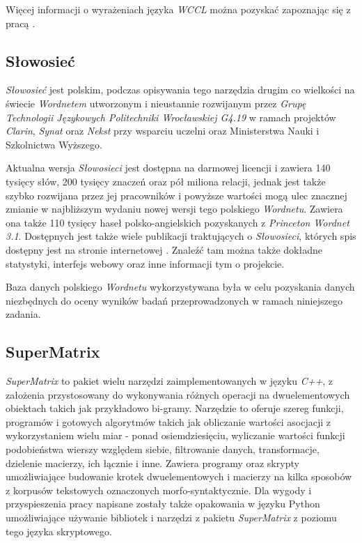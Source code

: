 \documentclass[11pt,a4paper]{llncs}
\begin{document}
Więcej informacji o wyrażeniach języka \emph{WCCL} można pozyskać zapoznając się z pracą \cite{wccl}.


\subsection{Słowosieć}

\emph{Słowosieć} jest polskim, podczas opisywania tego narzędzia drugim co wielkości na świecie \emph{Wordnetem} utworzonym i nieustannie rozwijanym przez \emph{Grupę Technologii Językowych Politechniki Wrocławskiej G4.19} w ramach projektów \emph{Clarin}, \emph{Synat} oraz \emph{Nekst} przy wsparciu uczelni oraz Ministerstwa Nauki i Szkolnictwa Wyższego.



Aktualna wersja \emph{Słowosieci} jest dostępna na darmowej licencji i zawiera 140 tysięcy słów, 200 tysięcy znaczeń oraz pół miliona relacji, jednak jest także szybko rozwijana przez jej pracowników i powyższe wartości mogą ulec znacznej zmianie w najbliższym wydaniu nowej wersji tego polskiego \emph{Wordnetu}.
Zawiera ona także 110 tysięcy haseł polsko-angielskich pozyskanych z \emph{Princeton Wordnet 3.1}.
Dostępnych jest także wiele publikacji traktujących o \emph{Słowosieci}, których spis dostępny jest na stronie internetowej \cite{slowosiec}.
Znaleźć tam można także dokładne statystyki, interfejs webowy oraz inne informacji tym o projekcie.



Baza danych polskiego \emph{Wordnetu} wykorzystywana była w celu pozyskania danych niezbędnych do oceny wyników badań przeprowadzonych w ramach niniejszego zadania.


\subsection{SuperMatrix}

\emph{SuperMatrix} to pakiet wielu narzędzi zaimplementowanych w języku \emph{C++}, z założenia przystosowany do wykonywania różnych operacji na dwuelementowych obiektach takich jak przykładowo bi-gramy. 
Narzędzie to oferuje szereg funkcji, programów i gotowych algorytmów takich jak obliczanie wartości asocjacji z wykorzystaniem wielu miar - ponad osiemdziesięciu, wyliczanie wartości funkcji podobieństwa wierszy względem siebie, filtrowanie danych, transformacje, dzielenie macierzy, ich łącznie i inne.
Zawiera programy oraz skrypty umożliwiające budowanie krotek dwuelementowych i macierzy na kilka sposobów z korpusów tekstowych oznaczonych morfo-syntaktycznie.
Dla wygody i przyspieszenia pracy napisane zostały także opakowania w języku Python umożliwiające używanie bibliotek i narzędzi z pakietu \emph{SuperMatrix} z poziomu tego języka skryptowego.
\end{document}
